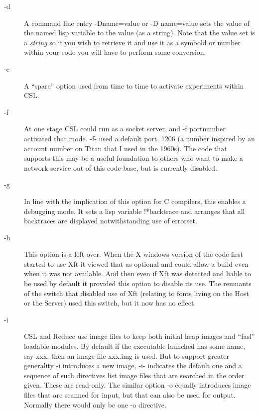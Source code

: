 \documentclass[a4paper,11pt]{article}
\begin{document}
\begin{description}
\item [{\ttfamily -d}] 
A command line entry {\ttfamily -Dname=value} or {\ttfamily -D name=value}
sets the value of the named lisp variable to the value (as a string).
Note that the value set is a {\em string} so if you wish to retrieve
it and use it as a symbold or number within your code you will have to
perform some conversion.

\item [{\ttfamily -e}] 
A ``spare'' option used from time to time to activate experiments within
CSL.

\item [{\ttfamily -f}] 
At one stage CSL could run as a socket server, and {\ttfamily -f portnumber}
activated that mode. {\ttfamily -f-} used a default port, 1206 (a number
inspired by an account number on Titan that I used in the 1960s). The code
that supports this may be a useful foundation to others who want to make a
network service out of this code-base, but is currently disabled.

\item [{\ttfamily -g}] 
In line with the implication of this option for C compilers, this enables
a debugging mode. It sets a lisp variable {\ttfamily !*backtrace} and
arranges that all backtraces are displayed notwithstanding use of
{\ttfamily errorset}.

\item [{\ttfamily -h}] 
This option is a left-over. When the X-windows version of the code first
started to use Xft it viewed that as optional and could allow a build even when
it was not available. And then even if Xft was detected and liable to be used
by default it provided this option to disable its use. The remnants of the
switch that disabled use of Xft (relating to fonts living on the Host or
the Server) used this switch, but it now has no effect.

\item [{\ttfamily -i}] 
CSL and Reduce use image files to keep both initial heap images and
``fasl'' loadable modules. By default if the executable launched has some name,
say xxx, then an image file xxx.img is used. But to support greater
generality {\ttfamily -i} introduces a new image, {\ttfamily -i-} indicates
the default one and a sequence of such directives list image files that are
searched in the order given. These are read-only. The similar option
{\ttfamily -o} equally introduces image files that are scanned for input, but
that can also be used for output. Normally there would only be one
{\ttfamily -o} directive.


\end{description}
\end{document}
